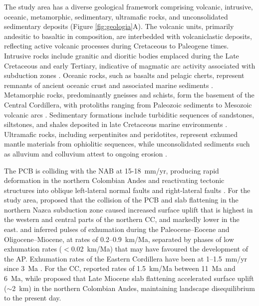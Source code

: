 \documentclass[draft]{agujournal2019}
\begin{document}
\par The study area has a diverse geological framework comprising volcanic, intrusive, oceanic, metamorphic, sedimentary, ultramafic rocks, and unconsolidated sedimentary deposits (Figure \ref{fig:geologia}A). The volcanic units, primarily andesitic to basaltic in composition, are interbedded with volcaniclastic deposits, reflecting active volcanic processes during Cretaceous to Paleogene times. Intrusive rocks include granitic and dioritic bodies emplaced during the Late Cretaceous and early Tertiary, indicative of magmatic arc activity associated with subduction zones \cite{restrepo2019}. Oceanic rocks, such as basalts and pelagic cherts, represent remnants of ancient oceanic crust and associated marine sediments \cite{Cediel2003}. Metamorphic rocks, predominantly gneisses and schists, form the basement of the Central Cordillera, with protoliths ranging from Paleozoic sediments to Mesozoic volcanic arcs \cite{Cediel2003}. Sedimentary formations include turbiditic sequences of sandstones, siltstones, and shales deposited in late Cretaceous marine environments \cite{cardona2012arc}. Ultramafic rocks, including serpentinites and peridotites, represent exhumed mantle materials from ophiolitic sequences, while unconsolidated sediments such as alluvium and colluvium attest to ongoing erosion \cite{Cediel2003}.

\par The PCB is colliding with the NAB at 15-18~mm/yr, producing rapid deformation in the northern Colombian Andes \cite{kellogg2019} and reactivating tectonic structures into oblique left-lateral normal faults and right-lateral faults \cite{acosta2007}. For the study area,  proposed that the collision of the PCB and slab flattening in the northern Nazca subduction zone caused increased surface uplift that is highest in the western and central parts of the northern CC, and markedly lower in the east.  and  inferred pulses of exhumation during the Paleocene–Eocene and Oligocene–Miocene, at rates of 0.2–0.9~km/Ma, separated by phases of low exhumation rates ($<$0.02~km/Ma) that may have favoured the development of the AP. Exhumation rates of the Eastern Cordillera have been at 1–1.5~mm/yr since 3~Ma \cite{mora2010}. For the CC,  reported rates of 1.5~km/Ma between 11~Ma and 6~Ma, while  proposed that Late Miocene slab ﬂattening accelerated surface uplift ($\sim$2~km) in the northern Colombian Andes, maintaining landscape disequilibrium to the present day.
\end{document}
